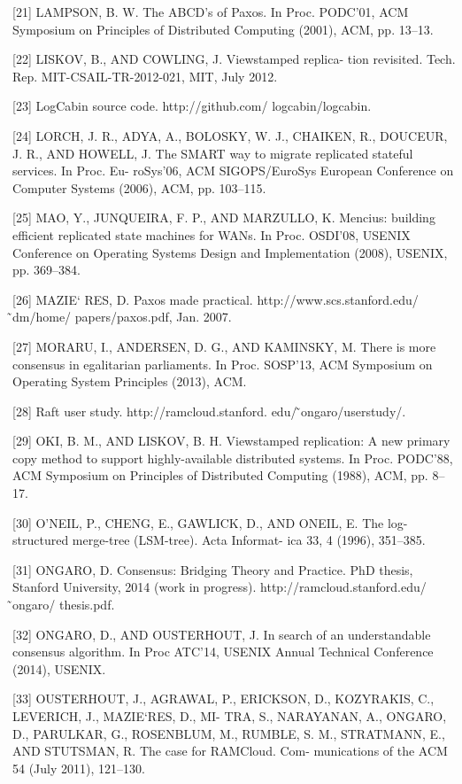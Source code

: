 \documentclass[journal]{IEEEtran}
\begin{document}
[21] LAMPSON, B. W. The ABCD’s of Paxos. In Proc. PODC’01, ACM Symposium on Principles of Distributed Computing (2001), ACM, pp. 13–13.

[22] LISKOV, B., AND COWLING, J. Viewstamped replica- tion revisited. Tech. Rep. MIT-CSAIL-TR-2012-021, MIT, July 2012.

[23] LogCabin source code. http://github.com/ logcabin/logcabin.

[24] LORCH, J. R., ADYA, A., BOLOSKY, W. J., CHAIKEN, R., DOUCEUR, J. R., AND HOWELL, J. The SMART way to migrate replicated stateful services. In Proc. Eu- roSys’06, ACM SIGOPS/EuroSys European Conference on Computer Systems (2006), ACM, pp. 103–115.

[25] MAO, Y., JUNQUEIRA, F. P., AND MARZULLO, K. Mencius: building efficient replicated state machines for
WANs. In Proc. OSDI’08, USENIX Conference on Operating Systems Design and Implementation (2008), USENIX, pp. 369–384.

[26] MAZIE` RES, D. Paxos made practical.
http://www.scs.stanford.edu/ ̃dm/home/ papers/paxos.pdf, Jan. 2007.

[27] MORARU, I., ANDERSEN, D. G., AND KAMINSKY, M. There is more consensus in egalitarian parliaments. In Proc. SOSP’13, ACM Symposium on Operating System Principles (2013), ACM.

[28] Raft user study. http://ramcloud.stanford. edu/ ̃ongaro/userstudy/.

[29] OKI, B. M., AND LISKOV, B. H. Viewstamped replication: A new primary copy method to support highly-available distributed systems. In Proc. PODC’88, ACM Symposium on Principles of Distributed Computing (1988), ACM, pp. 8–17.

[30] O’NEIL, P., CHENG, E., GAWLICK, D., AND ONEIL, E. The log-structured merge-tree (LSM-tree). Acta Informat- ica 33, 4 (1996), 351–385.

[31] ONGARO, D. Consensus: Bridging Theory and Practice. PhD thesis, Stanford University, 2014 (work in progress).
http://ramcloud.stanford.edu/ ̃ongaro/ thesis.pdf.

[32] ONGARO, D., AND OUSTERHOUT, J. In search of an understandable consensus algorithm. In Proc ATC’14, USENIX Annual Technical Conference (2014), USENIX.

[33] OUSTERHOUT, J., AGRAWAL, P., ERICKSON, D., KOZYRAKIS, C., LEVERICH, J., MAZIE`RES, D., MI- TRA, S., NARAYANAN, A., ONGARO, D., PARULKAR, G., ROSENBLUM, M., RUMBLE, S. M., STRATMANN, E., AND STUTSMAN, R. The case for RAMCloud. Com- munications of the ACM 54 (July 2011), 121–130.
\end{document}
